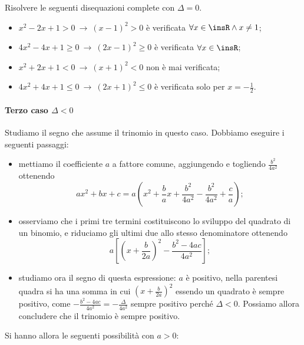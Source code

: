 \begin{exrig}
\begin{esempio}
Risolvere le seguenti disequazioni complete con $\Delta=0$.
\begin{itemize}
\item $x^2-2x+1>0\ \rightarrow \ (x-1)^2>0$ è verificata $\forall x\in \insR\wedge x\neq 1$;
\item $4x^2-4x+1\ge 0\ \rightarrow \ (2x-1)^2\ge 0$ è verificata $\forall x\in \insR$;
\item $x^2+2x+1<0\ \rightarrow \ (x+1)^2<0$ non è mai verificata;
\item $4x^2+4x+1\le 0\ \rightarrow \ (2x+1)^2\le 0$ è verificata solo per $x=-\frac 1 2$.
\end{itemize}
\end{esempio}
\end{exrig}

\paragraph{Terzo caso $\Delta <0$} Studiamo il segno che assume il trinomio in questo caso. Dobbiamo eseguire i seguenti passaggi:

\begin{itemize}
\item mettiamo il coefficiente $a$ a fattore comune, aggiungendo e togliendo $\frac{b^2} {4a^2}$ ottenendo 
\[{ax}^2+{bx}+c=a\left(x^2+\frac b ax+\frac{b^2} {4a^2}-\frac{b^2} {4a^2}+\frac c a\right);\]
\item osserviamo che i primi tre termini costituiscono lo sviluppo del quadrato di un binomio, e riduciamo gli ultimi due allo stesso denominatore ottenendo 
\[a\left[\left(x+\frac b {2a}\right)^2-\frac{b^2-4{ac}} {4a^2}\right];\]
\item studiamo ora il segno di questa espressione: $a$ è positivo, nella parentesi quadra si ha una somma in cui $\left(x+\frac b {2a}\right)^2$ essendo un quadrato è sempre positivo, come $-\frac{b^2-4{ac}} {4a^2}=-\frac{\Delta } {4a^2}$ sempre positivo perché $\Delta <0$. Possiamo allora concludere che il trinomio è sempre positivo.
\end{itemize}
Si hanno allora le seguenti possibilità con $a>0$:

